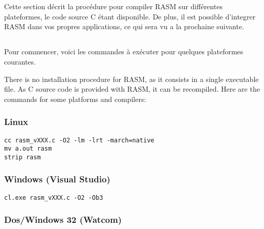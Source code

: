 \section{}

\begin{xfr}
Cette section décrit la procédure pour compiler RASM sur différentes plateformes, le code source C étant disponible. De plus, il est possible d'integrer RASM dans vos propres applications, ce qui sera vu a la prochaine suivante.
\end{xfr}

\subsection{}

\begin{xfr}
Pour commencer, voici les commandes à exécuter pour quelques plateformes courantes.
\end{xfr}

\begin{xen}
There is no installation procedure for RASM, as it consists in a single executable file. As C source code is provided with RASM, it can be recompiled. Here are the commands for some platforms and compilers:
\end{xen}

\subsubsection{Linux}

\begin{verbatim}
cc rasm_vXXX.c -O2 -lm -lrt -march=native
mv a.out rasm
strip rasm
\end{verbatim}

\subsubsection{Windows (Visual Studio)}

\begin{verbatim}
cl.exe rasm_vXXX.c -O2 -Ob3
\end{verbatim}

\subsubsection{Dos/Windows 32 (Watcom)}

